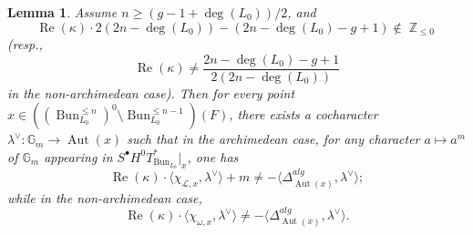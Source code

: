 \documentclass[12pt,reqno]{amsart}
\DeclareMathOperator\Z{\mathbb Z}
\newtheorem{lemma}[theorem]{Lemma}
\theoremstyle{definition}
\theoremstyle{remark}
\numberwithin{equation}{section}
\newcommand{\De}{\Delta}
\newcommand{\Aut}{\operatorname{Aut}}
\newcommand{\Ext}{\operatorname{Ext}}
\newcommand{\LL}{{\mathcal L}}
\newcommand{\sub}{\subset}
\newcommand{\om}{\omega}
\newcommand{\la}{\lambda}
\newcommand{\G}{{\mathbb G}}
\newcommand{\lan}{\langle}
\newcommand{\ran}{\rangle}
\newcommand{\Bun}{{\operatorname{Bun}}}
\renewcommand{\Re}{{\operatorname{Re}}}
\begin{document}
 



\begin{lemma}\label{surjective-Bun-prop}
Assume $n\ge (g-1+\deg(L_0))/2$, and
$$\operatorname{Re}(\kappa)\cdot 2(2n-\deg(L_0))-(2n-\deg(L_0)-g+1)\not\in\Z_{\le 0}$$
(resp.,
$$\operatorname{Re}(\kappa)\neq \frac{2n-\deg(L_0)-g+1}{2(2n-\deg(L_0))}$$
in the non-archimedean case).
Then for every point $x\in ((\Bun_{L_0}^{\le n})^0\setminus \Bun_{L_0}^{\le n-1})(F)$, there exists a cocharacter
$\la^\vee:\G_m\to \Aut(x)$ such that in the archimedean case, for any character $a\mapsto a^m$ of $\G_m$ appearing in
$S^\bullet H^0T^*_{\Bun_{L_0}}|_x$, one has
$$\Re(\kappa)\cdot \lan \chi_{\LL,x},\la^\vee\ran+m\neq -\lan\De^{alg}_{\Aut(x)},\la^\vee\ran;$$
while in the non-archimedean case,
$$\Re(\kappa)\cdot \lan \chi_{\om,x},\la^\vee\ran\neq -\lan\De^{alg}_{\Aut(x)},\la^\vee\ran.$$
\end{lemma}
\end{document}
